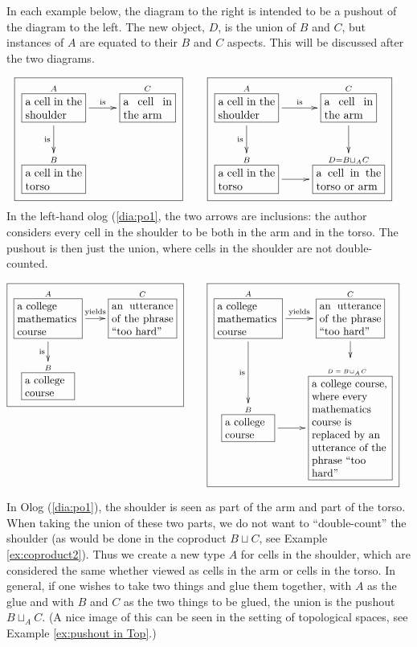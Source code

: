 \documentclass[a4paper]{book}
\def\tn{\textnormal}
\def\hsp{\hspace{.3in}}
\def\rr{\raggedright}
\newcommand{\LA}[2]{\ar[#1]^-{\tn {#2}}}
\newcommand{\LAL}[2]{\ar[#1]_-{\tn {#2}}}
\newcommand{\obox}[3]{\stackrel{#1}{\fbox{\parbox{#2}{#3}}}}
\theoremstyle{myth}
\newtheorem{exampleENG}[envENG]{\begin{english}Example\end{english}}
\begin{document}
\begin{russian}
\begin{exampleENG}[Pushout]\label{ex:pushout}
In each example below, the diagram to the right is intended to be a pushout of the diagram to the left.  The new object, $D$, is the union of $B$ and $C$, but instances of $A$ are equated to their $B$ and $C$ aspects.  This will be discussed after the two diagrams.

\begin{align}
\label{dia:po1}\fbox{\xymatrixnocompile{\obox{A}{.7in}{a cell in the shoulder}\LA{r}{is}\LAL{d}{is}&\obox{C}{.6in}{a cell in the arm}\\\obox{B}{.7in}{a cell in the torso}}}\hsp&\fbox{\xymatrix{\obox{A}{.7in}{a cell in the shoulder}\LA{r}{is}\LAL{d}{is}&\obox{C}{.6in}{a cell in the arm}\LA{d}{}\\\obox{B}{.7in}{a cell in the torso}\LA{r}{}&\obox{D=B\sqcup_AC}{.8in}{a cell in the torso or arm}}}
\end{align}
In the left-hand olog (\ref{dia:po1}, the two arrows are inclusions: the author considers every cell in the shoulder to be both in the arm and in the torso. The pushout is then just the union, where cells in the shoulder are not double-counted.

\begin{align}\label{dia:po2}\fbox{\xymatrixnocompile@=18pt{\obox{A}{.8in}{\rr a college mathematics course}\LA{r}{yields}\LAL{d}{is}&\obox{C}{.8in}{an utterance of the phrase “too hard”}\\\obox{B}{.6in}{\rr a college course}}}\hsp&\fbox{\xymatrixnocompile@=18pt{\obox{A}{.8in}{\rr a college mathematics course}\LA{r}{yields}\LAL{d}{is}&\obox{C}{.8in}{an utterance of the phrase “too hard”}\LA{d}{}\\\obox{B}{.6in}{\rr a college course}\LA{r}{}&\obox{\parbox{.6in}{\vspace{.1in}\tiny$D=B\!\sqcup_A\!C$}}{1in}{\rr a college course, where every mathematics course is replaced by an utterance of the phrase “too hard”}}}
\end{align}

In Olog (\ref{dia:po1}), the shoulder is seen as part of the arm and part of the torso.  When taking the union of these two parts, we do not want to “double-count” the shoulder (as would be done in the coproduct $B\sqcup C$, see Example \ref{ex:coproduct2}).  Thus we create a new type $A$ for cells in the shoulder, which are considered the same whether viewed as cells in the arm or cells in the torso.  In general, if one wishes to take two things and glue them together, with $A$ as the glue and with $B$ and $C$ as the two things to be glued, the union is the pushout $B\sqcup_AC$. (A nice image of this can be seen in the setting of topological spaces, see Example \ref{ex:pushout in Top}.)


\end{exampleENG}
\end{russian}
\end{document}

